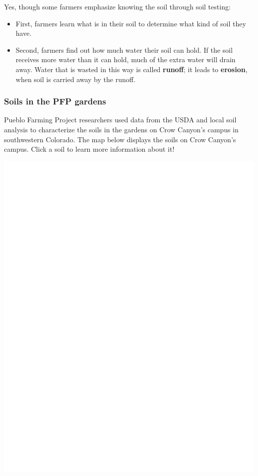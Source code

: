 \documentclass[12pt,]{article}
\providecommand{\tightlist}{%
  \setlength{\itemsep}{0pt}\setlength{\parskip}{0pt}}
\begin{document}
Yes, though some farmers emphasize knowing the soil through soil testing:

\begin{itemize}
\tightlist
\item
  First, farmers learn what is in their soil to determine what kind of soil they have.
\item
  Second, farmers find out how much water their soil can hold. If the soil receives more water than it can hold, much of the extra water will drain away. Water that is wasted in this way is called \textbf{runoff}; it leads to \textbf{erosion}, when soil is carried away by the runoff.
\end{itemize}

\hypertarget{soils-in-the-pfp-gardens}{%
\subsubsection*{Soils in the PFP gardens}\label{soils-in-the-pfp-gardens}}

Pueblo Farming Project researchers used data from the USDA and local soil analysis to characterize the soils in the gardens on Crow Canyon's campus in southwestern Colorado. The map below displays the soils on Crow Canyon's campus. Click a soil to learn more information about it!

\includegraphics{images/unnamed-chunk-2-1.pdf}
\end{document}
